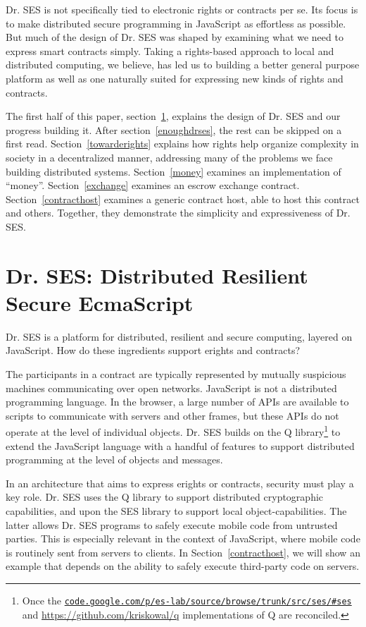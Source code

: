\documentclass{llncs}
\newcommand{\myurl}[1]{{\href{http://#1}{\texttt{#1}}}}
\begin{document}
Dr. SES is not specifically tied to electronic rights or contracts per se. Its focus is to make distributed secure programming in JavaScript as effortless as possible. But much of the design of Dr. SES
%
%
was shaped by examining what we need to express smart contracts simply. Taking a rights-based approach to local and distributed computing, we believe, has led us to building a better general purpose platform as well as one naturally suited for expressing new kinds of rights and contracts.

The first half of this paper, section~\ref{drses}, explains the design of Dr. SES and our progress building it.  After section~\ref{enoughdrses}, the rest can be skipped on a first read. Section~\ref{towarderights} explains how rights help organize complexity in society in a decentralized manner, addressing many of the problems we face building distributed systems. Section~\ref{money} examines an implementation of ``money''. Section~\ref{exchange} examines an escrow exchange contract. Section~\ref{contracthost} examines a generic contract host, able to host this contract and others. Together, they demonstrate the simplicity and expressiveness of Dr. SES.



\section{Dr. SES: Distributed Resilient Secure EcmaScript}
\label{drses}

Dr. SES is a platform for distributed, resilient and secure computing, layered on JavaScript. How do these ingredients support erights and contracts?

The participants in a contract are typically represented by mutually suspicious machines communicating over open networks. JavaScript is not a distributed programming language. In the browser, a large number of APIs are available to scripts to communicate with servers and other frames, but these APIs do not operate at the level of individual objects. Dr. SES builds on the Q library\footnote{
%
Once the \myurl{code.google.com/p/es-lab/source/browse/trunk/src/ses/\#ses} and \url{https://github.com/kriskowal/q} implementations of Q are reconciled.
%
} to extend the JavaScript language with a handful of features to support distributed programming at the level of objects and messages.

In an architecture that aims to express erights or contracts, security must play a key role. Dr. SES uses the Q library to support distributed cryptographic capabilities, and upon the SES library to support local object-capabilities. The latter allows Dr. SES programs to safely execute mobile code from untrusted parties.
This is especially relevant in the context of JavaScript, where mobile code is routinely sent from servers to clients. In Section~\ref{contracthost}, we will show an example that  depends on the ability to safely execute third-party code on servers.
\end{document}
